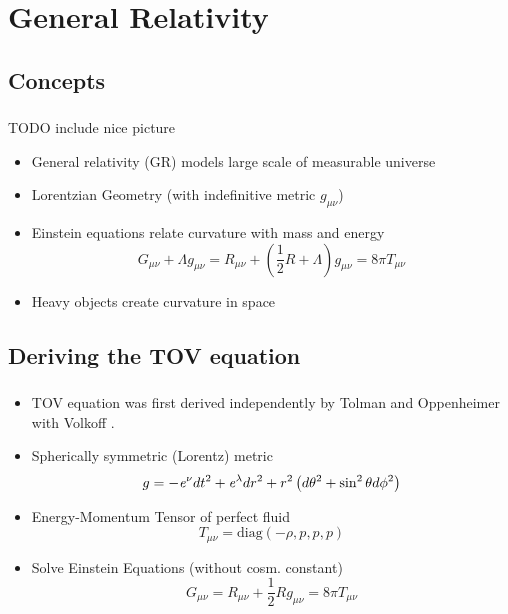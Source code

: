 \section{General Relativity}

\subsection{Concepts}
\begin{frame}
	\frametitle{\insertsubsection}
	TODO include nice picture %
	\begin{itemize}[<+->]
		\item General relativity (GR) models large scale of measurable universe
		\item Lorentzian Geometry (with indefinitive metric $g_{\mu\nu}$)
		\item Einstein equations relate curvature with mass and energy
		\[G_{\mu\nu} + \Lambda g_{\mu\nu}=R_{\mu\nu}+\left(\frac{1}{2}R+\Lambda\right)g_{\mu\nu}=8\pi T_{\mu\nu}\]
		\item Heavy objects create curvature in space
	\end{itemize}
\end{frame}


\subsection{Deriving the TOV equation}
\begin{frame}
	\frametitle{\insertsubsection}
	\begin{itemize}[<+->]
		\item TOV equation was first derived 
		independently by Tolman \cite{tolmanStaticSolutionsEinstein1939} and 
		Oppenheimer with Volkoff \cite{oppenheimerMassiveNeutronCores1939}.
		\item Spherically symmetric (Lorentz) metric 
		\begin{equation}
			g=-\mathit{e}^\nu dt^2+\mathit{e}^\lambda dr^2+r^2\left(d\theta^2+\sin^2\theta d\phi^2\right)
		\end{equation}
		\item Energy-Momentum Tensor of perfect fluid
		\begin{equation}
			T_{\mu\nu}=\text{diag}(-\rho,p,p,p)
		\end{equation}
		\item Solve Einstein Equations (without cosm. constant)
		\begin{equation}
			G_{\mu\nu}=R_{\mu\nu}+\frac{1}{2}Rg_{\mu\nu}=8\pi T_{\mu\nu}
		\end{equation}
	\end{itemize}
\end{frame}

